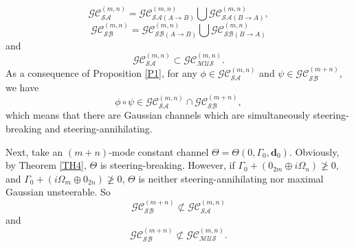 \documentclass[10pt,aps,pra,amsfonts,amssymb,amsmath,%
floatfix,nofootinbib, groupedaddress,superscriptaddress,citesort,twocolumn
]{revtex4}%
\begin{document}
$$	{\mathcal {GC}}^{(m,n)}_{\mathcal {SA}}={\mathcal {GC}}^{(m,n)}_{\mathcal {SA}(A \rightarrow B)} \bigcup {\mathcal {GC}}^{(m,n)}_{\mathcal {SA}(B \rightarrow A)},$$
$$	{\mathcal {GC}}^{(m,n)}_{\mathcal {SB}}={\mathcal {GC}}^{(m,n)}_{\mathcal {SB}(A \rightarrow B)} \bigcup {\mathcal {GC}}^{(m,n)}_{\mathcal {SB}(B \rightarrow A)}$$
	 and
	$${\mathcal {GC}}^{(m,n)}_{\mathcal {SA}} \subset{\mathcal {GC}}^{(m,n)}_{\mathcal {MUS}}.$$
As a consequence
	of Proposition \ref{P1}, for any  $\phi\in {\mathcal {GC}}^{(m,n)}_{\mathcal {SA}} $  and  $\psi\in {\mathcal{GC}}^{(m+n)}_{\mathcal {SB}}$,  we have $$\phi \circ \psi \in{\mathcal {GC}}^{(m,n)}_{\mathcal {SA}} \cap {\mathcal{GC}}^{(m+n)}_{\mathcal {SB}}, $$
which means that  there are Gaussian channels which are
	simultaneously steering-breaking and steering-annihilating.
	
Next,  take an $(m+n)$-mode  constant channel $\Theta=\Theta(0,\Gamma_0,\mathbf d_0)$. Obviously,  by Theorem \ref{TH4},
$\Theta $  is steering-breaking.  However,  if  $\Gamma_0 +(0_{2m}\oplus i\Omega_{n})\ngeq 0 $,  and $\Gamma_0 +(i\Omega_{m}\oplus 0_{2n} )\ngeq 0$,  $\Theta$ is
neither steering-annihilating  nor maximal Gaussian unsteerable. So 
$$ {\mathcal{GC}}^{(m+n)}_{\mathcal {SB}}  \not\subset {\mathcal {GC}}^{(m,n)}_{\mathcal {SA} }$$ and
$$ {\mathcal{GC}}^{(m+n)}_{\mathcal {SB}}  \not\subset {\mathcal {GC}}^{(m,n)}_{\mathcal {MUS}}.$$
\end{document}
